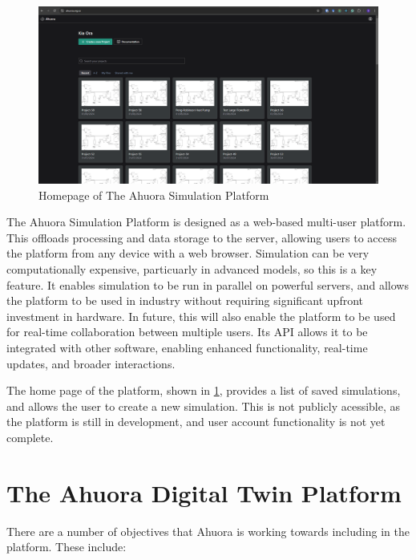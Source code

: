 \documentclass[12pt]{report}
\begin{document}
\begin{figure}
    \centering
    \includegraphics[width=\textwidth]{platform_homepage.png}
    \caption{Homepage of The Ahuora Simulation Platform}
    \label{fig:homepage}
\end{figure}

The Ahuora Simulation Platform is designed as a web-based multi-user platform. This offloads processing and data storage to the server, allowing users to access the platform from any device with a web browser. Simulation can be very computationally expensive, particuarly in advanced models, so this is a key feature. It enables simulation to be run in parallel on powerful servers, and allows the platform to be used in industry without requiring significant upfront investment in hardware. In future, this will also enable the platform to be used for real-time collaboration between multiple users. Its API allows it to be integrated with other software, enabling enhanced functionality, real-time updates, and broader interactions.

The home page of the platform, shown in \cref{fig:homepage}, provides a list of saved simulations, and allows the user to create a new simulation. This is not publicly acessible, as the platform is still in development, and user account functionality is not yet complete.

\section{The Ahuora Digital Twin Platform}

There are a number of objectives that Ahuora is working towards including in the platform. These include:
\end{document}
